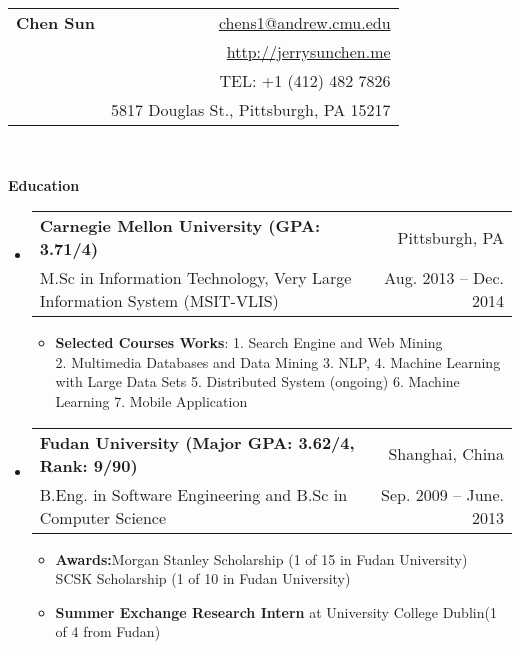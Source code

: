 \documentclass[letterpaper,10pt]{article}
\makeatletter
\newcommand{\resitem}[1]{\item #1 \vspace{-2pt}}
\newcommand{\resheading}[1]{{\large \colorbox{mygrey}{\begin{minipage}{\textwidth}{\textbf{#1 \vphantom{p\^{E}}}}\end{minipage}}}}
\newcommand{\ressubheading}[4]{
\begin{tabular*}{6.5in}{l@{\extracolsep{\fill}}r}
		\textbf{#1} & #2 \\
		#3 & #4 \\
\end{tabular*}\vspace{-6pt}}
\makeatother
\begin{document}
\newcommand{\mywebheader}{
\begin{tabular*}{7in}{l@{\extracolsep{\fill}}r}
	\textbf{{\Huge Chen Sun}} & \href{mailto:chens1@andrew.cmu.edu}{chens1@andrew.cmu.edu}\\
	& \href{http://jerrysunchen.me}{http://jerrysunchen.me} \\
     & {TEL: +1 (412) 482 7826}\\
    &{5817 Douglas St., Pittsburgh, PA 15217}
	\end{tabular*}
\\
\vspace{0.1in}}

\mywebheader


\resheading{Education}
	\begin{itemize}
       \item
			\ressubheading{{Carnegie Mellon University} (GPA: 3.71/4)}{Pittsburgh, PA}{M.Sc in Information Technology, Very Large Information System (MSIT-VLIS)}{Aug. 2013 -- Dec. 2014}
			{
				\begin{itemize}
                    
                    \resitem{\textbf{Selected Courses Works}: 1. Search Engine and Web Mining\\2. Multimedia Databases and Data Mining 3. NLP, 4. Machine Learning with Large Data Sets 5. Distributed System (ongoing) 6. Machine Learning 7. Mobile Application}
				\end{itemize}
			}


    \item
	\ressubheading{{Fudan University} (Major GPA: 3.62/4, Rank: 9/90)}{Shanghai, China}{B.Eng. in Software Engineering and B.Sc in Computer Science}{Sep. 2009 -- June. 2013}
				{
				\begin{itemize}
                    \resitem{\textbf{Awards:}Morgan Stanley Scholarship (1 of 15 in Fudan University)\\
                    SCSK Scholarship (1 of 10 in Fudan University)}
                    \resitem{\textbf{Summer Exchange Research Intern} at University College Dublin(1 of 4 from Fudan)}
                    	
				\end{itemize}
				}
	\end{itemize} %
\end{document}
